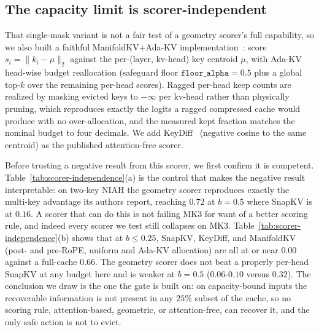 \subsection{The capacity limit is scorer-independent}
\label{subsec:scorer-independence}

That single-mask variant is not a fair test of a geometry scorer's full
capability, so we also built a faithful ManifoldKV+Ada-KV
implementation~\citep{arxiv260208343,arxiv240711550}: score $s_i =
\lVert k_i - \mu \rVert_2$ against the per-(layer, kv-head) key centroid
$\mu$, with Ada-KV head-wise budget reallocation (safeguard floor
$\texttt{floor\_alpha} = 0.5$ plus a global top-$k$ over the remaining
per-head scores). Ragged per-head keep counts are realized by masking
evicted keys to $-\infty$ per kv-head rather than physically pruning,
which reproduces exactly the logits a ragged compressed cache would
produce with no over-allocation, and the measured kept fraction matches
the nominal budget to four decimals. We add KeyDiff~\citep{keydiff}
(negative cosine to the same centroid) as the published attention-free
scorer.

Before trusting a negative result from this scorer, we first confirm it
is competent. Table~\ref{tab:scorer-independence}(a) is the control that
makes the negative result interpretable: on two-key NIAH the geometry
scorer reproduces exactly the multi-key advantage its authors report,
reaching $0.72$ at $b = 0.5$ where SnapKV is at $0.16$. A scorer that can
do this is not failing MK3 for want of a better scoring rule, and indeed
every scorer we test still collapses on MK3.
Table~\ref{tab:scorer-independence}(b) shows that at $b \le 0.25$,
SnapKV, KeyDiff, and ManifoldKV (post- and pre-RoPE, uniform and Ada-KV
allocation) are all at or near $0.00$ against a full-cache $0.66$. The
geometry scorer does not beat a properly per-head SnapKV at any budget
here and is weaker at $b = 0.5$ ($0.06$-$0.10$ versus $0.32$). The
conclusion we draw is the one the gate is built on: on capacity-bound
inputs the recoverable information is not present in any $25\%$ subset
of the cache, so no scoring rule, attention-based, geometric, or
attention-free, can recover it, and the only safe action is not to
evict.

